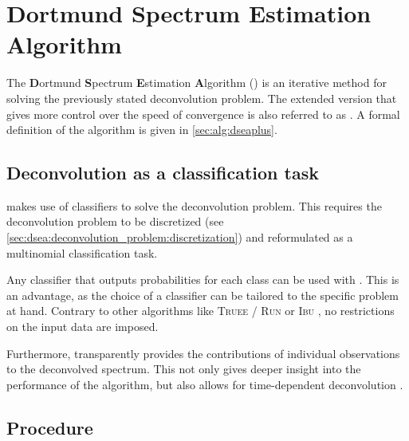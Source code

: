 \section{Dortmund Spectrum Estimation Algorithm} \label{sec:dsea:dsea}

The \textbf{D}ortmund \textbf{S}pectrum \textbf{E}stimation \textbf{A}lgorithm
  (\dsea{})
  \cite{dsea_unification}
is an iterative method for solving the previously stated deconvolution problem.
The extended version \cite{dsea_mirko}
  that
    gives more control over the speed of convergence
is also referred to as \dseaplus{}.
%
A formal definition of the \dseaplus{} algorithm is given in \autoref{sec:alg:dseaplus}.


\subsection{Deconvolution as a classification task} %
\dsea{} makes use of classifiers to solve the deconvolution problem.
This requires the deconvolution problem to be
  discretized (see \autoref{sec:dsea:deconvolution_problem:discretization})
  and reformulated as a multinomial classification task.

Any classifier that outputs probabilities for each class
  can be used with \dsea{}.
This is an advantage,
  as the choice of a classifier can be tailored to the specific problem at hand.
Contrary to other algorithms like
  \textsc{Truee} / \textsc{Run} \cite{milke2013} or
  \textsc{Ibu} \cite{dagostini1995, dagostini2010},
no restrictions on the input data are imposed.

Furthermore,
\dsea{} transparently provides the contributions of individual observations to the deconvolved spectrum.
This not only gives deeper insight into the performance of the algorithm,
but also allows for time-dependent deconvolution \cite{dsea_mirko}. %


\clearpage %
\subsection{Procedure}


